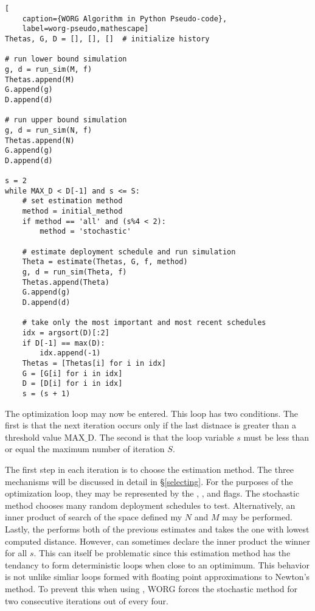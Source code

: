 \clearpage
\begin{lstlisting}[
    caption={WORG Algorithm in Python Pseudo-code},
    label=worg-pseudo,mathescape]
Thetas, G, D = [], [], []  # initialize history

# run lower bound simulation
g, d = run_sim(M, f)
Thetas.append(M)
G.append(g)
D.append(d)

# run upper bound simulation    
g, d = run_sim(N, f)
Thetas.append(N)
G.append(g)
D.append(d)

s = 2
while MAX_D < D[-1] and s <= S:
    # set estimation method
    method = initial_method
    if method == 'all' and (s%4 < 2):
        method = 'stochastic'

    # estimate deployment schedule and run simulation
    Theta = estimate(Thetas, G, f, method)
    g, d = run_sim(Theta, f)
    Thetas.append(Theta)
    G.append(g)
    D.append(d)

    # take only the most important and most recent schedules
    idx = argsort(D)[:2]
    if D[-1] == max(D):
        idx.append(-1)
    Thetas = [Thetas[i] for i in idx]
    G = [G[i] for i in idx]
    D = [D[i] for i in idx]
    s = (s + 1)
\end{lstlisting}
\clearpage

The optimization loop may now be entered.  This loop has two conditions.
The first is that the next iteration occurs only if the last distnace
is greater than a threshold value $\mathrm{MAX\_D}$. The second is that 
the loop variable $s$ must be less than or equal the maximum number
of iteration $S$.

The first step in each iteration is to choose the estimation method. The
three mechanisms will be discussed in detail in \S\ref{selecting}. For
the purposes of the optimization loop, they may be represented by the 
\stochastic, \innerprod, and \allflag flags. The stochastic method 
chooses many random deployment schedules to test. Alternatively, an inner
product of search of the space defined my $N$ and $M$ may be performed. 
Lastly, the \allflag performs both of the previous estimates and takes
the one with lowest computed distance.  However, \allflag can sometimes
declare the inner product the winner for all $s$.  This can itself 
be problematic since this estimation method has the tendancy to form 
deterministic loops when close to an optimimum. This behavior is not unlike
simliar loops formed with floating point approximations to Newton's method.
To prevent this when using \allflag, WORG forces the stochastic method
for two consecutive iterations out of every four.  
 
